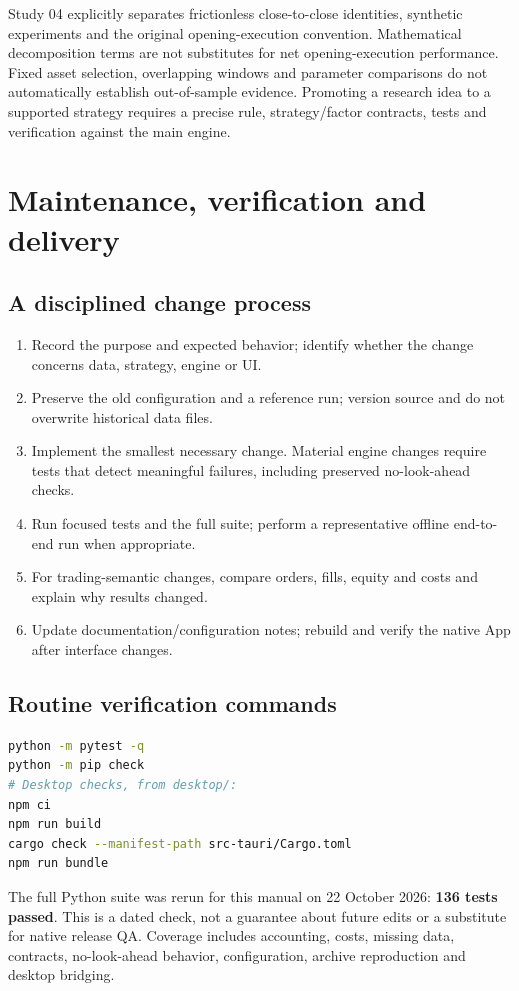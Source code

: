 \documentclass[11pt]{article}
\newcommand{\chapterpage}{\par}
\let\originalsection\section
\renewcommand{\section}{\Needspace{9\baselineskip}\originalsection}
\let\originalsubsection\subsection
\renewcommand{\subsection}{\Needspace{8\baselineskip}\originalsubsection}
\begin{document}
Study 04 explicitly separates frictionless close-to-close identities, synthetic experiments and the original opening-execution convention. Mathematical decomposition terms are not substitutes for net opening-execution performance. Fixed asset selection, overlapping windows and parameter comparisons do not automatically establish out-of-sample evidence. Promoting a research idea to a supported strategy requires a precise rule, strategy/factor contracts, tests and verification against the main engine.

\chapterpage
\section{Maintenance, verification and delivery}
\subsection{A disciplined change process}
\begin{enumerate}
\item Record the purpose and expected behavior; identify whether the change concerns data, strategy, engine or UI.
\item Preserve the old configuration and a reference run; version source and do not overwrite historical data files.
\item Implement the smallest necessary change. Material engine changes require tests that detect meaningful failures, including preserved no-look-ahead checks.
\item Run focused tests and the full suite; perform a representative offline end-to-end run when appropriate.
\item For trading-semantic changes, compare orders, fills, equity and costs and explain why results changed.
\item Update documentation/configuration notes; rebuild and verify the native App after interface changes.
\end{enumerate}

\subsection{Routine verification commands}
\begin{lstlisting}[language=bash]
python -m pytest -q
python -m pip check
# Desktop checks, from desktop/:
npm ci
npm run build
cargo check --manifest-path src-tauri/Cargo.toml
npm run bundle
\end{lstlisting}
The full Python suite was rerun for this manual on 22 October 2026: \textbf{136 tests passed}. This is a dated check, not a guarantee about future edits or a substitute for native release QA. Coverage includes accounting, costs, missing data, contracts, no-look-ahead behavior, configuration, archive reproduction and desktop bridging.
\end{document}
